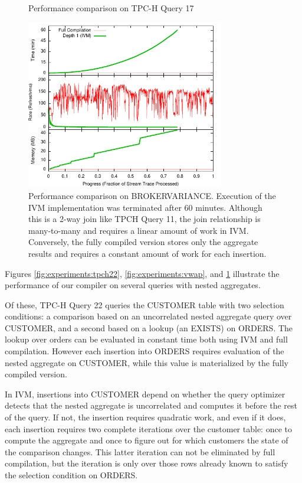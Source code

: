 \begin{figure}
\begin{center}
\caption{Performance comparison on TPC-H Query 17}
\label{fig:experiments:tpch17}
\end{center}
\end{figure}

\begin{figure}
\begin{center}
\includegraphics[width=3.4in]{../graphs/graphs/unified_brokervariance.pdf}
\caption{Performance comparison on BROKERVARIANCE.  Execution of the IVM implementation was terminated after 60 minutes.  Although this is a 2-way join like TPCH Query 11, the join relationship is many-to-many and requires a linear amount of work in IVM.  Conversely, the fully compiled version stores only the aggregate results and requires a constant amount of work for each insertion.}
\label{fig:experiments:brokervariance}
\end{center}
\end{figure}

Figures \ref{fig:experiments:tpch22}, \ref{fig:experiments:vwap}, and \ref{fig:experiments:tpch17} illustrate the performance of our compiler on several queries with nested aggregates.

Of these, TPC-H Query 22 queries the CUSTOMER table with two selection conditions: a comparison based on an uncorrelated nested aggregate query over CUSTOMER, and a second based on a lookup (an EXISTS) on ORDERS.  The lookup over orders can be evaluated in constant time both using IVM and full compilation.  However each insertion into ORDERS requires evaluation of the nested aggregate on CUSTOMER, while this value is materialized by the fully compiled version.  

In IVM, insertions into CUSTOMER depend on whether the query optimizer detects that the nested aggregate is uncorrelated and computes it before the rest of the query.  If not, the insertion requires quadratic work, and even if it does, each insertion requires two complete iterations over the customer table: once to compute the aggregate and once to figure out for which customers the state of the comparison changes.  This latter iteration can not be eliminated by full compilation, but the iteration is only over those rows already known to satisfy the selection condition on ORDERS.

